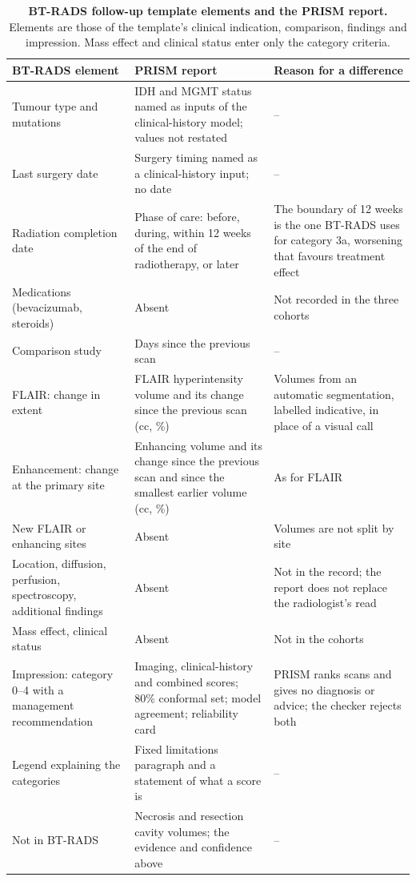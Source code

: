 \documentclass[11pt,a4paper]{article}
\begin{document}
\begin{table}[H]
\centering
\small
\renewcommand{\thetable}{S6}\renewcommand{\theHtable}{S6}
\caption{\textbf{BT-RADS follow-up template elements and the PRISM report.} Elements are those of the template's
clinical indication, comparison, findings and impression. Mass effect and clinical status enter only the category
criteria.}
\label{tab:S46}
\zebrarows
\begin{tabularx}{\linewidth}{@{}R{3.6cm} L R{4.2cm}@{}}
\toprule
BT-RADS element & PRISM report & Reason for a difference \\
\midrule
Tumour type and mutations & IDH and MGMT status named as inputs of the clinical-history model; values not restated & -- \\
Last surgery date & Surgery timing named as a clinical-history input; no date & -- \\
Radiation completion date & Phase of care: before, during, within 12 weeks of the end of radiotherapy, or later &
The boundary of 12 weeks is the one BT-RADS uses for category 3a, worsening that favours treatment effect \\
Medications (bevacizumab, steroids) & Absent & Not recorded in the three cohorts \\
Comparison study & Days since the previous scan & -- \\
FLAIR: change in extent & FLAIR hyperintensity volume and its change since the previous scan (cc, \%) &
Volumes from an automatic segmentation, labelled indicative, in place of a visual call \\
Enhancement: change at the primary site & Enhancing volume and its change since the previous scan and since the
smallest earlier volume (cc, \%) & As for FLAIR \\
New FLAIR or enhancing sites & Absent & Volumes are not split by site \\
Location, diffusion, perfusion, spectroscopy, additional findings & Absent & Not in the record; the report does not
replace the radiologist's read \\
Mass effect, clinical status & Absent & Not in the cohorts \\
Impression: category 0--4 with a management recommendation & Imaging, clinical-history and combined scores; 80\% conformal
set; model agreement; reliability card & PRISM ranks scans and gives no diagnosis or advice; the checker rejects
both \\
Legend explaining the categories & Fixed limitations paragraph and a statement of what a score is & -- \\
Not in BT-RADS & Necrosis and resection cavity volumes; the evidence and confidence above & -- \\
\bottomrule
\end{tabularx}
\end{table}
\end{document}
